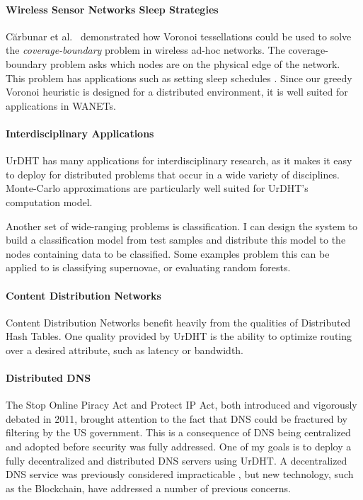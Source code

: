 \documentclass[letterpaper]{article}
\begin{document}
\paragraph*{Wireless Sensor Networks Sleep Strategies} C\u{a}rbunar et al.\ \cite{carbunar2004distributed} demonstrated how Voronoi tessellations could be used to solve the \textit{coverage-boundary} problem in wireless ad-hoc networks.
The coverage-boundary problem asks which nodes are on the physical edge of the network.
This problem  has applications such as setting sleep schedules \cite{chen2008voronoi}.
Since our greedy Voronoi heuristic is designed for a distributed environment, it is well suited for applications in WANETs. 


\paragraph*{Interdisciplinary Applications}
UrDHT has many applications for interdisciplinary research, as it makes it easy to deploy for distributed problems that occur in a wide variety of disciplines.
Monte-Carlo approximations are particularly well suited for UrDHT's computation model.

Another set of wide-ranging problems is classification.  
I can design the system to build a classification model from test samples and distribute this model to the nodes containing data to be classified.
Some examples problem this can be applied to is classifying supernovae, or evaluating random forests.


\paragraph*{Content Distribution Networks}
Content Distribution Networks benefit heavily from the qualities of Distributed Hash Tables.
One quality provided by UrDHT is the ability to optimize routing over a desired attribute, such as latency or bandwidth.



\paragraph*{Distributed DNS}
The Stop Online Piracy Act and Protect IP Act, both introduced and vigorously debated in 2011, brought attention to the fact that DNS could be fractured by filtering by the US government.
This is a consequence of DNS being centralized  and adopted before security was fully addressed.
One of my goals is to deploy a fully decentralized and distributed DNS servers using UrDHT.
A decentralized DNS service was previously considered impracticable \cite{cox2002serving}, but new technology, such as the Blockchain, have addressed a number of previous concerns.
\end{document}

